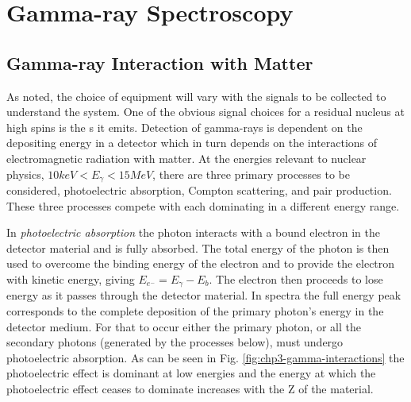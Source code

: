 \section{Gamma-ray Spectroscopy}
\label{sec:exp-pr-gamma-spec}
\subsection{Gamma-ray Interaction with Matter}
\label{ssec:exp-pr-gamma-spec-interactions}
As noted, the choice of equipment will vary with the signals to be collected to understand the system. One of the obvious signal choices for a residual nucleus at high spins is the \gr{}s it emits. Detection of gamma-rays is dependent on the \gr{} depositing energy in a detector which in turn depends on the interactions of electromagnetic radiation with matter. At the energies relevant to nuclear physics, $10keV<E_{\gamma}<15MeV$, there are three primary processes to be considered, photoelectric absorption, Compton scattering, and pair production. These three processes compete with each dominating in a different energy range.

In \emph{photoelectric absorption} the photon interacts with a bound electron in the detector material and is fully absorbed\cite{einstein-PE}. The total energy of the photon is then used to overcome the binding energy of the electron and to provide the electron with kinetic energy, giving $E_{e^-}=E_{\gamma}-E_b$. The electron then proceeds to lose energy as it passes through the detector material. In \gr{} spectra the full energy peak corresponds to the complete deposition of the primary photon's energy in the detector medium. For that to occur either the primary photon, or all the secondary photons (generated by the processes below), must undergo photoelectric absorption. As can be seen in Fig. \ref{fig:chp3-gamma-interactions} the photoelectric effect is dominant at low energies and the energy at which the photoelectric effect ceases to dominate increases with the Z of the material.


